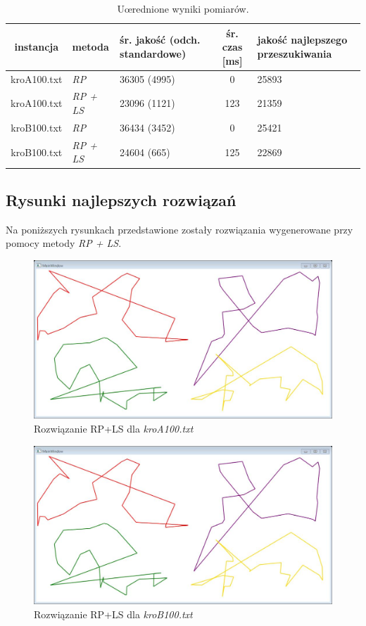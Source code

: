\documentclass{article}
\begin{document}

\begin{table}[h!]
\begin{center}
\centering
  \begin{tabular}{| c | D | S | c | S | }
\hline
	instancja & metoda & śr. jakość (odch. standardowe) & śr. czas [ms] & jakość najlepszego przeszukiwania \\ \hline
    kroA100.txt & \emph{RP} & 36305 (4995) & 0 & 25893 \\
    kroA100.txt & \emph{RP + LS} & 23096 (1121) & 123 & 21359 \\
\hline
    kroB100.txt & \emph{RP} & 36434 (3452) & 0 & 25421 \\
    kroB100.txt & \emph{RP + LS} & 24604 (665) & 125 & 22869 \\
\hline
  \end{tabular}
\end{center}
\caption{Uœrednione wyniki pomiarów.} \label{tab:wynikils}
\end{table}

\subsection{Rysunki najlepszych rozwiązań}
Na poniższych rysunkach przedstawione zostały rozwiązania wygenerowane przy pomocy metody \emph{RP + LS}.
\begin{figure}[h!]
\centering\includegraphics[width=17cm]{img/rys2.png}
\caption{Rozwiązanie RP+LS dla \emph{kroA100.txt}}
\end{figure}
\begin{figure}[h!]
\centering\includegraphics[width=17cm]{img/rys3.png}
\caption{Rozwiązanie RP+LS dla \emph{kroB100.txt}}
\end{figure}
\end{document}
